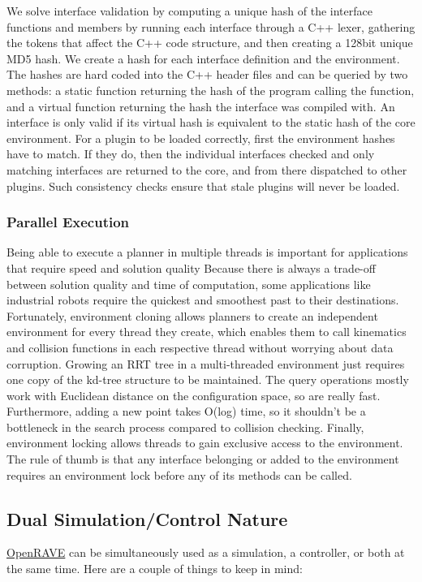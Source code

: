 We solve interface validation by computing a unique hash of the interface functions and members by running each interface through a C++ lexer, gathering the tokens that affect the C++ code structure, and then creating a 128bit unique MD5 hash. We create a hash for each interface definition and the environment. The hashes are hard coded into the C++ header files and can be queried by two methods: a static function returning the hash of the program calling the function, and a virtual function returning the hash the interface was compiled with. An interface is only valid if its virtual hash is equivalent to the static hash of the core environment. For a plugin to be loaded correctly, first the environment hashes have to match. If they do, then the individual interfaces checked and only matching interfaces are returned to the core, and from there dispatched to other plugins. Such consistency checks ensure that stale plugins will never be loaded.\hypertarget{architecture__concepts_arch_cloning_parallel}{}\subsubsection{Parallel Execution}\label{architecture__concepts_arch_cloning_parallel}
Being able to execute a planner in multiple threads is important for applications that require speed and solution quality Because there is always a trade-\/off between solution quality and time of computation, some applications like industrial robots require the quickest and smoothest past to their destinations. Fortunately, environment cloning allows planners to create an independent environment for every thread they create, which enables them to call kinematics and collision functions in each respective thread without worrying about data corruption. Growing an RRT tree in a multi-\/threaded environment just requires one copy of the kd-\/tree structure to be maintained. The query operations mostly work with Euclidean distance on the configuration space, so are really fast. Furthermore, adding a new point takes O(log) time, so it shouldn’t be a bottleneck in the search process compared to collision checking. Finally, environment locking allows threads to gain exclusive access to the environment. The rule of thumb is that any interface belonging or added to the environment requires an environment lock before any of its methods can be called.\hypertarget{architecture__concepts_arch_dualnature}{}\subsection{Dual Simulation/Control Nature}\label{architecture__concepts_arch_dualnature}
\hyperlink{namespaceOpenRAVE}{OpenRAVE} can be simultaneously used as a simulation, a controller, or both at the same time. Here are a couple of things to keep in mind:


